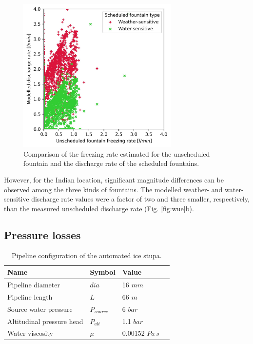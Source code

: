 \documentclass[tc, manuscript]{copernicus}
\begin{document}
\begin{figure}[htb]
\includegraphics[width=8cm]{Figures/simvsreal.jpg}

\caption{ Comparison of the freezing rate estimated for the unscheduled fountain and the discharge rate of the
scheduled fountains. }

\label{fig:simvsreal}
\end{figure}

However, for the Indian location, significant magnitude differences can be observed among the three kinds of
fountains. The modelled weather- and water-sensitive discharge rate values were a factor of two and three smaller, respectively,
than the measured unscheduled discharge rate (Fig. \ref{fig:wue}b).


\subsection{Pressure losses}

\begin{table}[htb]
\centering
\caption{Pipeline configuration of the automated ice stupa.}
\label{tab:pipe}
\begin{tabular}{@{}llll@{}}
\toprule
\textbf{Name} & \textbf{Symbol} & \textbf{Value} & \\ \midrule
\multicolumn{1}{|l}{Pipeline diameter}      & $dia$ & 16 $mm$ & \multicolumn{1}{l|}{} \\ \midrule
\multicolumn{1}{|l}{Pipeline length}        & $L$ & 66 $m$ & \multicolumn{1}{l|}{} \\ \midrule
\multicolumn{1}{|l}{Source water pressure} & $P_{source}$ & 6 $bar$  & \multicolumn{1}{l|}{} \\\midrule 
\multicolumn{1}{|l}{Altitudinal pressure head}  & $P_{alt}$ & 1.1 $bar$ & \multicolumn{1}{l|}{} \\ \midrule
\multicolumn{1}{|l}{Water viscosity}  & $\mu$ & 0.00152 $Pa\,s$ & \multicolumn{1}{l|}{} \\ \bottomrule
\end{tabular}
\end{table}
\end{document}
